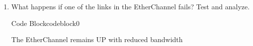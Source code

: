 \documentclass[a4paper]{article}
\begin{document}
\begin{enumerate}
	\item What happens if one of the links in the EtherChannel fails? Test and analyze.


	      \begin{ocg}{Code Block}{codeblock}{0}

		      \vspace{0.5cm}
		      \begin{tcolorbox}
			      The EtherChannel remains UP with reduced bandwidth
		      \end{tcolorbox}
	      \end{ocg}


\end{enumerate}
\end{document}
